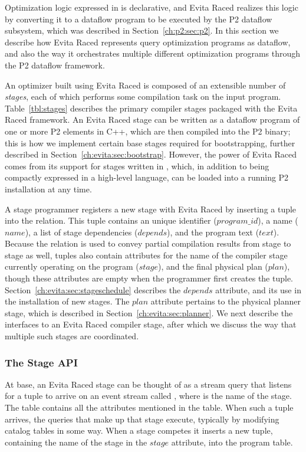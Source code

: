 Optimization logic expressed in \OVERLOG is declarative, and Evita Raced
realizes this logic by converting it to a dataflow program to be executed by
the P2 dataflow subsystem, which was described in Section~\ref{ch:p2:sec:p2}.
In this section we describe how Evita Raced represents query optimization
programs as dataflow, and also the way it orchestrates multiple different
optimization programs through the P2 dataflow framework.

An optimizer built using Evita Raced is composed of an extensible number of
{\em stages}, each of which performs some compilation task on the input
program.  Table~\ref{tbl:stages} describes the primary compiler stages packaged
with the Evita Raced framework.  An Evita Raced stage can be written as a
dataflow program of one or more P2 elements in C++, which are then compiled
into the P2 binary; this is how we implement certain base stages required for
bootstrapping, further described in Section~\ref{ch:evita:sec:bootstrap}.  However,
the power of Evita Raced comes from its support for stages written in \OVERLOG,
which, in addition to being compactly expressed in a high-level language, can
be loaded into a running P2 installation at any time.

A stage programmer registers a new stage with Evita Raced by inserting a tuple
into the  relation.  This tuple contains an unique identifier
($program\_id$), a name ($name$), a list of stage dependencies ($depends$), and
the program text ($text$).  Because the  relation is used to convey
partial compilation results from stage to stage as well,  tuples
also contain attributes for the name of the compiler stage currently operating
on the program ($stage$), and the final physical plan ($plan$), though these
attributes are empty when the programmer first creates the tuple.
Section~\ref{ch:evita:sec:stageschedule} describes the $depends$ attribute, and
its use in the installation of new stages.  The $plan$ attribute pertains to
the physical planner stage, which is described in
Section~\ref{ch:evita:sec:planner}.  We next describe the interfaces to an
Evita Raced compiler stage, after which we discuss the way that multiple such
stages are coordinated.

\subsubsection{The Stage API}
\label{ch:evita:sec:stages}

At base, an Evita Raced stage can be thought of as a stream query that listens
for a tuple to arrive on an event stream called ,
where  is the name of the stage.  The 
table contains all the attributes mentioned in the  table.  When
such a tuple arrives, the queries that make up that stage execute, typically by
modifying catalog tables in some way.  When a stage competes it inserts a new
 tuple, containing the name of the stage in the $stage$ attribute,
into the program table.

